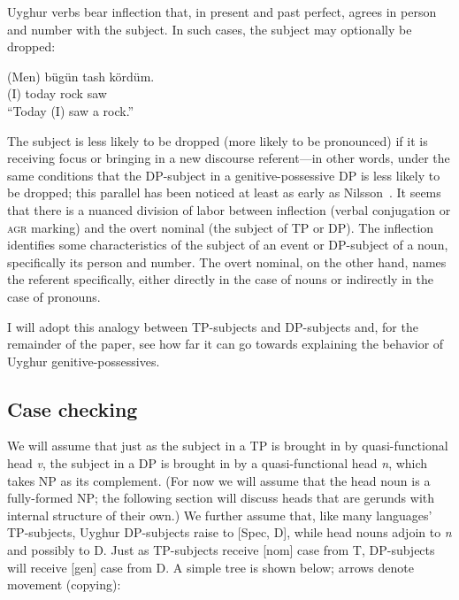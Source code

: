 \documentclass[letterpaper,12pt]{article}
\newcommand{\posst}{\textsc{agr}}
\begin{document}
Uyghur verbs bear
inflection that, in present and past perfect, agrees in person and number with the subject. In such cases, the subject may optionally be dropped:
\begin{exe}
\ex \gll (Men) b\"ug\"un tash k\"ord\"um.\\
				 (I) today rock saw\\
		\glt ``Today (I) saw a rock.''
\end{exe}
 The subject is
less likely to be dropped (more likely to be pronounced) if it is receiving focus or bringing in a new discourse referent---in other words, under the same
conditions that the DP-subject in a genitive-possessive DP is less likely to be dropped; this parallel has been noticed at least as early as
Nilsson~\citeyear[p. 151]{Nilsson}. It seems that there is a nuanced division of labor between inflection
(verbal conjugation or \posst{} marking) and the overt nominal (the subject of TP or DP). The inflection identifies some characteristics of the
subject of an event or DP-subject of a noun, specifically its person and number. The overt nominal, on the other hand, names the referent specifically, either directly in the case of nouns or indirectly in the case of pronouns.

I will adopt this analogy between TP-subjects and DP-subjects and, for the remainder of the paper, see how far it can go towards explaining the behavior of Uyghur
genitive-possessives. 

\subsection{Case checking}
We will assume that just as the subject in a TP is brought in by quasi-functional head \textit{v}, the subject in a DP is brought in by a quasi-functional head \textit{n}, which takes NP as its complement. (For now we will assume that the head noun is a fully-formed NP; the following section will discuss heads that are gerunds with internal structure of their own.) We further assume that, like many languages' TP-subjects, Uyghur DP-subjects raise to [Spec, D], while head nouns adjoin to \textit{n} and possibly to D. Just as TP-subjects receive [nom] case from T, DP-subjects will receive [gen] case from D. A simple tree is shown below; arrows denote movement (copying):
\end{document}
